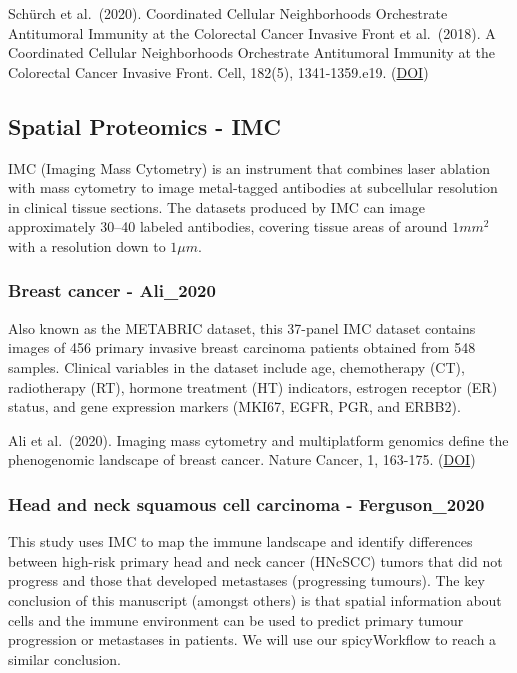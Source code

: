\documentclass[
  letterpaper,
  DIV=11,
  numbers=noendperiod]{scrreprt}
\begin{document}
Schürch et al.~(2020). Coordinated Cellular Neighborhoods Orchestrate
Antitumoral Immunity at the Colorectal Cancer Invasive Front et
al.~(2018). A Coordinated Cellular Neighborhoods Orchestrate Antitumoral
Immunity at the Colorectal Cancer Invasive Front. Cell, 182(5),
1341-1359.e19. (\href{https://doi.org/10.1016/j.cell.2020.07.005}{DOI})

\subsection*{Spatial Proteomics - IMC}\label{spatial-proteomics---imc}

IMC (Imaging Mass Cytometry) is an instrument that combines laser
ablation with mass cytometry to image metal-tagged antibodies at
subcellular resolution in clinical tissue sections. The datasets
produced by IMC can image approximately 30--40 labeled antibodies,
covering tissue areas of around \(1mm^2\) with a resolution down to
\(1 \mu m\).

\subsubsection*{Breast cancer -
Ali\_2020}\label{breast-cancer---ali_2020}

Also known as the METABRIC dataset, this 37-panel IMC dataset contains
images of 456 primary invasive breast carcinoma patients obtained from
548 samples. Clinical variables in the dataset include age, chemotherapy
(CT), radiotherapy (RT), hormone treatment (HT) indicators, estrogen
receptor (ER) status, and gene expression markers (MKI67, EGFR, PGR, and
ERBB2).

Ali et al.~(2020). Imaging mass cytometry and multiplatform genomics
define the phenogenomic landscape of breast cancer. Nature Cancer, 1,
163-175. (\href{https://doi.org/10.1038/s43018-020-0026-6}{DOI})

\subsubsection*{Head and neck squamous cell carcinoma -
Ferguson\_2020}\label{head-and-neck-squamous-cell-carcinoma---ferguson_2020}

This study uses IMC to map the immune landscape and identify differences
between high-risk primary head and neck cancer (HNcSCC) tumors that did
not progress and those that developed metastases (progressing tumours).
The key conclusion of this manuscript (amongst others) is that spatial
information about cells and the immune environment can be used to
predict primary tumour progression or metastases in patients. We will
use our spicyWorkflow to reach a similar conclusion.
\end{document}
